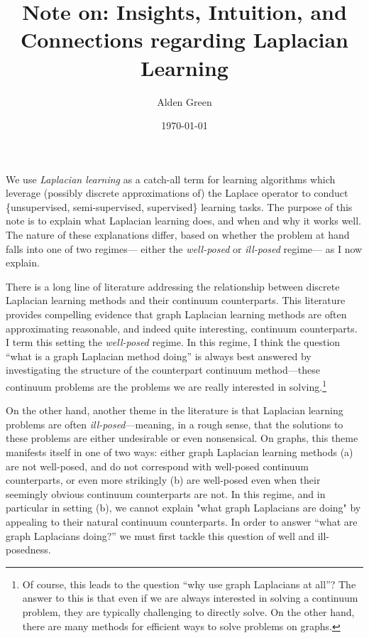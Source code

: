 \documentclass{article}
\newcommand{\1}{\mathbf{1}}
\theoremstyle{definition}
\theoremstyle{remark}
\begin{document}
\title{Note on: Insights, Intuition, and Connections regarding Laplacian Learning}
\author{Alden Green}
\date{\today}
\maketitle

We use \emph{Laplacian learning} as a catch-all term for learning algorithms which leverage (possibly discrete approximations of) the Laplace operator to conduct \{unsupervised, semi-supervised, supervised\} learning tasks. The purpose of this note is to explain what Laplacian learning does, and when and why it works well. The nature of these explanations differ, based on whether the problem at hand falls into one of two regimes--- either the \emph{well-posed} or \emph{ill-posed} regime--- as I now explain.

There is a long line of literature addressing the relationship between discrete Laplacian learning methods and their continuum counterparts. This literature provides compelling evidence that graph Laplacian learning methods are often approximating reasonable, and indeed quite interesting, continuum counterparts. I term this setting the \emph{well-posed} regime. In this regime, I think the question ``what is a graph Laplacian method doing'' is always best answered by investigating the structure of the counterpart continuum method---these continuum problems are the problems we are really interested in solving.\footnote{Of course, this leads to the question ``why use graph Laplacians at all''? The answer to this is that even if we are always interested in solving a continuum problem, they are typically challenging to directly solve. On the other hand, there are many methods for efficient ways to solve problems on graphs.}

On the other hand, another theme in the literature is that Laplacian learning problems are often \emph{ill-posed}---meaning, in a rough sense, that the solutions to these problems are either undesirable or even nonsensical. On graphs, this theme manifests itself in one of two ways: either graph Laplacian learning methods (a) are not well-posed, and do not correspond with well-posed continuum counterparts, or even more strikingly (b) are well-posed even when their seemingly obvious continuum counterparts are not. In this regime, and in particular in setting (b), we cannot explain "what graph Laplacians are doing" by appealing to their natural continuum counterparts. In order to answer ``what are graph Laplacians doing?'' we must first tackle this question of well and ill-posedness.
\end{document}
